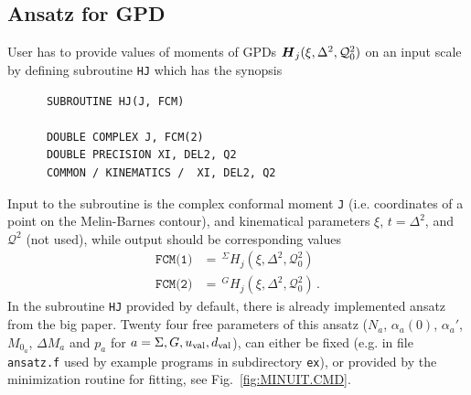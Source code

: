 \documentclass[12pt]{article}
\begin{document}
\subsection{Ansatz for GPD}
\label{ssect:ansatz}

User has to provide values of moments of GPDs $\mbox{\boldmath $H$}_{j} 
(\xi,\Delta^2,\mathcal{Q}_{0}^2)$
on an input scale by defining subroutine \texttt{HJ} which has the synopsis
\begin{verbatim}
      SUBROUTINE HJ(J, FCM)

      DOUBLE COMPLEX J, FCM(2)
      DOUBLE PRECISION XI, DEL2, Q2
      COMMON / KINEMATICS /  XI, DEL2, Q2
\end{verbatim}
Input to the subroutine is the complex conformal moment \texttt{J} (i.e. coordinates of a point
on the Melin-Barnes contour), and kinematical parameters $\xi$, $t=\Delta^2$, and $\mathcal{Q}^2$
(not used), while output should be corresponding values
\begin{align}
\texttt{FCM(1)}& =\, ^{\Sigma}\!H_{j} (\xi,\Delta^2,\mathcal{Q}_{0}^2)  \\
\texttt{FCM(2)}& =\, ^{G}\!H_{j}(\xi,\Delta^2,\mathcal{Q}_{0}^2) \,.
\label{eq:FCM}
\end{align}
In the subroutine \texttt{HJ} provided by default, there is already implemented ansatz
from the big paper.
Twenty four free parameters of this ansatz ($N_a$, $\alpha_{a}(0)$, $\alpha_{a}'$,
$M_{0_a}$, $\Delta M_a$ and $p_a$ for  $a = \Sigma, G, u_{\rm val}, d_{\rm val}$),
can either be fixed (e.g. in file \texttt{ansatz.f} used by example programs in
subdirectory \texttt{ex}), or provided by the minimization routine for fitting, see
Fig.~\ref{fig:MINUIT.CMD}.
\end{document}
